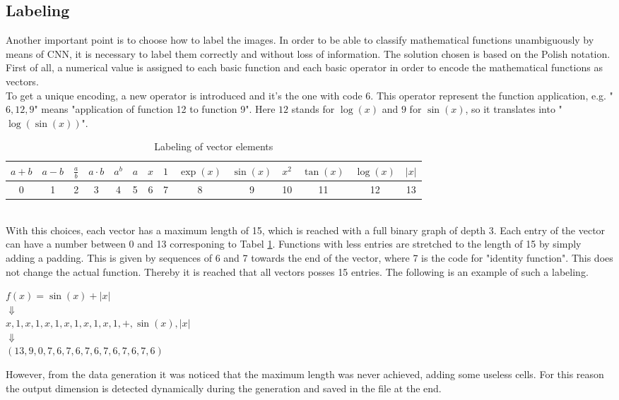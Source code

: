 \subsection{Labeling}
Another important point is to choose how to label the images. In order to be able to classify mathematical functions unambiguously by means of CNN, it is necessary to label them correctly and without loss of information. The solution chosen is based on the Polish notation.
First of all, a numerical value is assigned to each basic function and each basic operator in order to encode the mathematical functions as vectors.\\
To get a unique encoding, a new operator is introduced and it's the one with code 6. This operator represent the function application, e.g. "$6,12,9$" means "application of function 12 to function 9". Here $12$ stands for $\log(x)$ and $9$ for $\sin(x)$, so it translates into "$\log(\sin(x))$".\\
\begin{table}[h!]
	\centering
	\begin{tabular}{c|c|c|c|c|c|c|c|c|c|c|c|c|c}
		\(a+b\)&\(a-b\)&$\frac{a}{b}$&\(a \cdot b\)&\(a^b\)&\(a\)&\(x\)&\(1\)&\( \exp(x) \) & \( \sin(x) \) & \( x^2 \) & \( \tan(x) \) & \( \log(x) \) & \( |x| \)\\
		\hline
		0&1&2&3&4&5&6&7&8&9&10&11&12&13
	\end{tabular}
	\caption{Labeling of vector elements}
	\label{table:LabelingVector}
\end{table}\\
With this choices, each vector has a maximum length of 15, which is reached with a full binary graph of depth 3. Each entry of the vector can have a number between 0 and 13 corresponing to Tabel \ref{table:LabelingVector}. Functions with less entries are stretched to the length of 15 by simply adding a padding. This is given by sequences of 6 and 7 towards the end of the vector, where 7 is the code for "identity function". This does not change the actual function. Thereby it is reached that all vectors posses 15 entries. The following is an example of such a labeling.\\
\begin{center}
	\(f(x) = \sin(x)+|x|\) \\
	$\Downarrow$ \\ 
	\(x,1,x,1,x,1,x,1,x,1,x,1,+,\sin(x),|x|\)\\
	$\Downarrow$ \\ 
	\( (13,9,0,7,6,7,6,7,6,7,6,7,6,7,6) \)\\
\end{center}
However, from the data generation it was noticed that the maximum length was never achieved, adding some useless cells. For this reason the output dimension is detected dynamically during the generation and saved in the file at the end.

